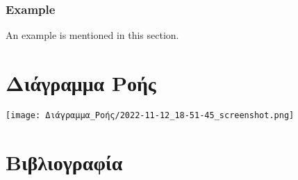 \documentclass[11pt]{article}
\begin{document}
\subsubsection{Example}
\label{sec:org37c6b21}
An example is mentioned in this section.

\section{Διάγραμμα Ροής}
\label{sec:orgc0c8781}
\begin{center}
\texttt{[image: Διάγραμμα\_Ροής/2022-11-12\_18-51-45\_screenshot.png]}
\end{center}


\section{Βιβλιογραφία}
\label{sec:org19bfb05}


\end{document}
